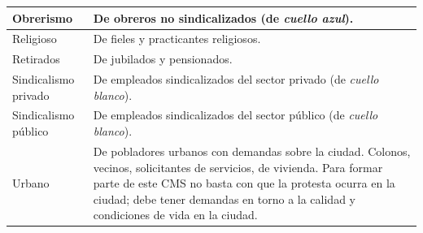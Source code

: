 \documentclass[letterpaper, 11pt]{book}
\theoremstyle{definition}
\theoremstyle{remark}
\begin{document}
{{{{{{{{{{\begin{footnotesize}
\begin{longtable}{| p{4cm}@{ } | p{11cm}@{ } |}
\hline
Obrerismo & De obreros no sindicalizados (de \emph{cuello azul}).\\
\hline
Religioso & De fieles y practicantes religiosos.\\
\hline
Retirados & De jubilados y pensionados.\\
\hline
Sindicalismo privado & De empleados sindicalizados del sector privado (de \emph{cuello blanco}).\\
\hline
Sindicalismo público & De empleados sindicalizados del sector público (de \emph{cuello blanco}).\\
\hline
Urbano & De pobladores urbanos con demandas sobre la ciudad. Colonos, vecinos, solicitantes de servicios, de vivienda. Para formar parte de este CMS no basta con que la protesta ocurra en la ciudad; debe tener demandas en torno a la calidad y condiciones de vida en la ciudad.\\
\hline
\end{longtable}
\end{footnotesize}









}}}}}}}}}}
\end{document}
